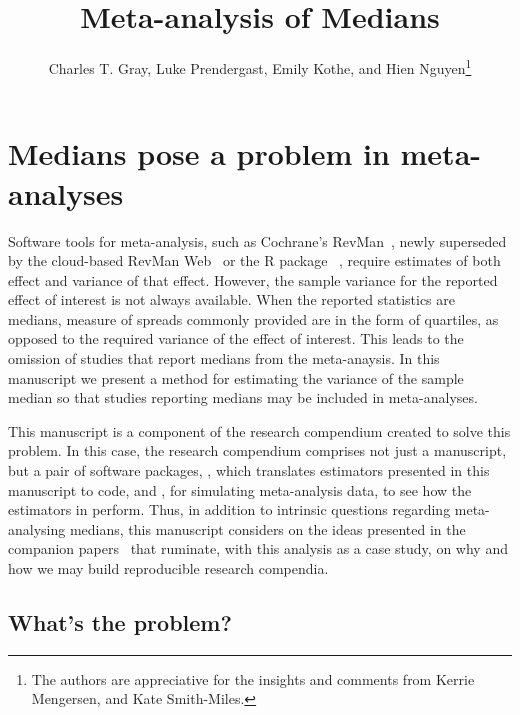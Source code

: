 \documentclass{article}
\title{Meta-analysis of Medians}
\author{Charles T. Gray, Luke Prendergast, Emily Kothe, and Hien Nguyen\thanks{
The authors are appreciative for the insights and comments from Kerrie Mengersen, and Kate Smith-Miles.
}}
\begin{document}
\maketitle


\begin{abstract}
\end{abstract}


\section{Medians pose a problem in meta-analyses}

Software tools for meta-analysis, such as Cochrane's
RevMan~\cite{reviewmanagerRevMan}, newly superseded by the cloud-based RevMan Web~\cite{reviewmanagerRevManWeb}
or the R package ~\cite{viechtbauerConductingMetaanalysesMetafor2010},
require estimates of both effect and variance
of that effect. However, the sample variance for the reported effect of interest is not always available.
When the reported statistics are medians, measure of spreads commonly provided are in the form of quartiles, as opposed to the required variance of the effect of interest. This leads to the omission of studies that report medians from the meta-anaysis. In this manuscript we present a method for estimating the variance of the sample median so that studies reporting medians may be included in meta-analyses.

This manuscript is a component of the research compendium created to solve this problem. In this case, the research compendium comprises not just a manuscript, but a pair of software packages, , which translates estimators presented in this manuscript to code, and , for simulating meta-analysis data, to see how the estimators in  perform. Thus, in addition to intrinsic questions regarding meta-analysing medians, this manuscript considers on the ideas presented in the companion papers~\cite{gray2019textttcodeproof, grayTruthProofReproducibility2019} that ruminate, with this analysis as a case study, on why and how we may build reproducible research compendia.

\subsection{What's the problem?}
\end{document}
